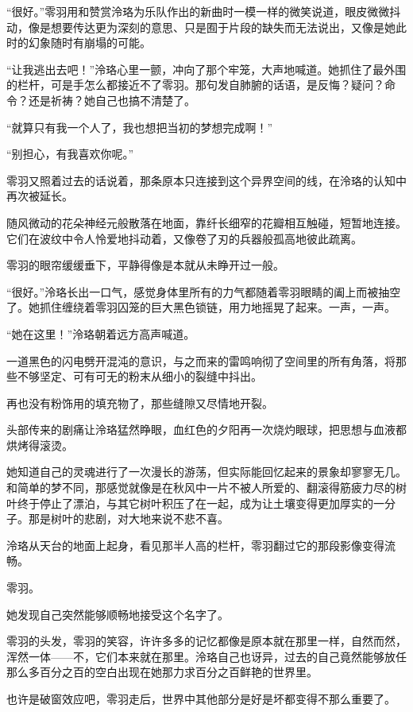 \documentclass[UTF8, scheme = chinese, openany]{ctexbook}
\begin{document}
“很好。”零羽用和赞赏泠珞为乐队作出的新曲时一模一样的微笑说道，眼皮微微抖动，像是想要传达更为深刻的意思、只是囿于片段的缺失而无法说出，又像是她此时的幻象随时有崩塌的可能。

“让我逃出去吧！”泠珞心里一颤，冲向了那个牢笼，大声地喊道。她抓住了最外围的栏杆，可是手怎么都接近不了零羽。那句发自肺腑的话语，是反悔？疑问？命令？还是祈祷？她自己也搞不清楚了。

“就算只有我一个人了，我也想把当初的梦想完成啊！”

“别担心，有我喜欢你呢。”

零羽又照着过去的话说着，那条原本只连接到这个异界空间的线，在泠珞的认知中再次被延长。

随风微动的花朵神经元般散落在地面，靠纤长细窄的花瓣相互触碰，短暂地连接。它们在波纹中令人怜爱地抖动着，又像卷了刃的兵器般孤高地彼此疏离。

零羽的眼帘缓缓垂下，平静得像是本就从未睁开过一般。

“很好。”泠珞长出一口气，感觉身体里所有的力气都随着零羽眼睛的阖上而被抽空了。她抓住缠绕着零羽囚笼的巨大黑色锁链，用力地摇晃了起来。一声，一声。

“她在这里！”泠珞朝着远方高声喊道。

\vspace{1.5em}

一道黑色的闪电劈开混沌的意识，与之而来的雷鸣响彻了空间里的所有角落，将那些不够坚定、可有可无的粉末从细小的裂缝中抖出。

再也没有粉饰用的填充物了，那些缝隙又尽情地开裂。

头部传来的剧痛让泠珞猛然睁眼，血红色的夕阳再一次烧灼眼球，把思想与血液都烘烤得滚烫。

她知道自己的灵魂进行了一次漫长的游荡，但实际能回忆起来的景象却寥寥无几。和简单的梦不同，那感觉就像是在秋风中一片不被人所爱的、翻滚得筋疲力尽的树叶终于停止了漂泊，与其它树叶积压了在一起，成为让土壤变得更加厚实的一分子。那是树叶的悲剧，对大地来说不悲不喜。

泠珞从天台的地面上起身，看见那半人高的栏杆，零羽翻过它的那段影像变得流畅。

零羽。

她发现自己突然能够顺畅地接受这个名字了。

零羽的头发，零羽的笑容，许许多多的记忆都像是原本就在那里一样，自然而然，浑然一体——不，它们本来就在那里。泠珞自己也讶异，过去的自己竟然能够放任那么多百分之百的空白出现在她那力求百分之百鲜艳的世界里。

也许是破窗效应吧，零羽走后，世界中其他部分是好是坏都变得不那么重要了。
\end{document}
